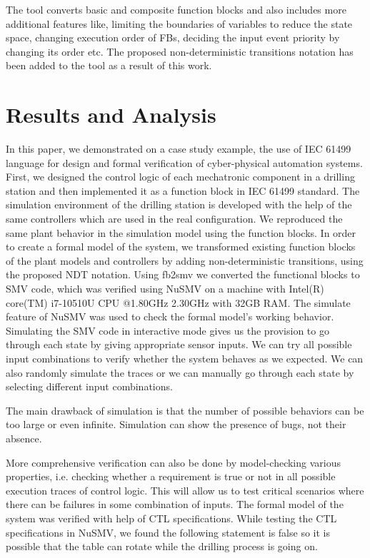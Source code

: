 \begin{bibunit}
The tool converts basic and composite function blocks and also includes more additional features like, limiting the boundaries of variables to reduce the state space, changing execution order of FBs, deciding the input event priority by changing its order etc. The proposed non-deterministic transitions notation has been added to the tool as a result of this work. 

\section{Results and Analysis}\label{sec:results}

In this paper, we demonstrated on a case study example, the use of IEC 61499 language for design and formal verification of cyber-physical automation systems. First, we designed the control logic of each mechatronic component in a drilling station and then implemented it as a function block in IEC 61499 standard. The simulation environment of the drilling station is developed with the help of the same controllers which are used in the real configuration. We reproduced the same plant behavior in the simulation model using the function blocks. In order to create a formal model of the system, we transformed existing function blocks of the plant models and controllers by adding non-deterministic transitions, using the proposed NDT notation. Using fb2smv we converted the functional blocks to SMV code, which was verified using NuSMV on a machine with Intel(R) core(TM) i7-10510U CPU @1.80GHz 2.30GHz with 32GB RAM. The simulate feature of NuSMV was used to check the formal model's working behavior. Simulating the SMV code in interactive mode gives us the provision to go through each state by giving appropriate sensor inputs. We can try all possible input combinations to verify whether the system behaves as we expected. We can also randomly simulate the traces or we can manually go through each state by selecting different input combinations.

The main drawback of simulation is that the number of possible behaviors can be too large or even infinite. Simulation can show the presence of bugs, not their absence. 

More comprehensive verification can also be done by model-checking various properties, i.e. checking whether a requirement is true or not in all possible execution traces of control logic. This will allow us to test critical scenarios where there can be failures in some combination of inputs. The formal model of the system was verified with help of CTL \cite{emerson1985decision} specifications. While testing the CTL specifications in NuSMV, we found the following statement is false so it is possible that the table can rotate while the drilling process is going on.


\end{bibunit}
